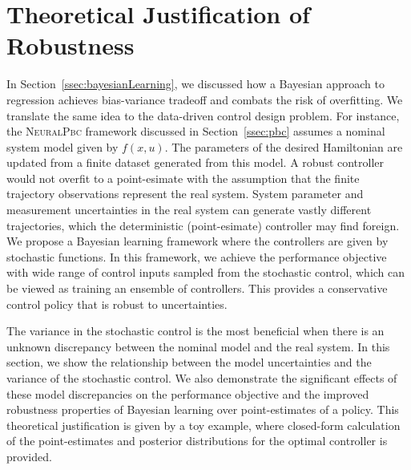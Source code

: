 \section{Theoretical Justification of Robustness}
\label{sec:bl_justification}

In Section~\ref{ssec:bayesianLearning}, we discussed how a Bayesian approach to
regression achieves bias-variance tradeoff and combats the risk of overfitting. 
%
We translate the same idea to the data-driven control design problem.
%
For instance, the \textsc{NeuralPbc} framework discussed in
Section~\ref{ssec:pbc} assumes a nominal system model given by $f(x, u)$.
%
The parameters of the desired Hamiltonian are updated from a finite dataset
generated from this model.
%
A robust controller would not overfit to a point-esimate with the assumption
that the finite trajectory observations represent the real system. 
%
System parameter and measurement uncertainties in the real system can generate
vastly different trajectories, which the deterministic (point-esimate)
controller may find foreign.
%
We propose a Bayesian learning framework where the controllers are given by
stochastic functions.
%
In this framework, we achieve the performance objective with wide range of
control inputs sampled from the stochastic control, which can be viewed as
training an ensemble of controllers.
%
This provides a conservative control policy that is robust to uncertainties.


The variance in the stochastic control is the most beneficial when there is an
unknown discrepancy between the nominal model and the real system.
%
In this section, we show the relationship between the model uncertainties and
the variance of the stochastic control.
%
We also demonstrate the significant effects of these model discrepancies on the
performance objective and the improved robustness properties of Bayesian
learning over point-estimates of a policy. This theoretical justification is
given by a toy example, where closed-form calculation of the point-estimates and
posterior distributions for the optimal controller is provided.

